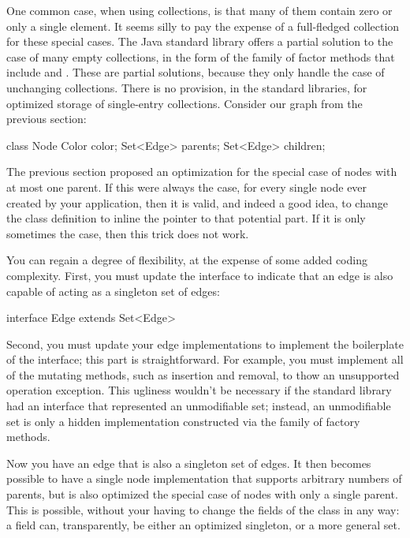 One common case, when using collections, is that many of them contain zero or
only a single element. It seems silly to pay the expense of a full-fledged
collection for these special cases. The Java standard library offers a
partial solution to the case of many empty collections, in the form of the family
of factor methods that include  and
.
These are partial solutions, because they only handle the case of unchanging
collections. There is no provision, in the standard libraries, for optimized
storage of single-entry collections. Consider our graph from the previous
section:
\begin{shortlisting}
class Node {
	Color color;
	Set<Edge> parents;
	Set<Edge> children;
}
\end{shortlisting}
The previous section proposed an optimization for the special case of nodes with
at most one parent. If this were always the case, for every single node ever
created by your application, then it is valid, and indeed a good idea,
to change the  class definition to inline the pointer to that
potential part. If it is only sometimes the case, then this trick does not work.

You can regain a degree of flexibility, at the expense of some added coding
complexity. First, you must update the  interface to indicate that an
edge is also capable of acting as a singleton set of edges:
\begin{shortlisting}
interface Edge extends Set<Edge> {
}
\end{shortlisting}

Second, you must update your edge implementations to implement the boilerplate of
the  interface; this part is straightforward. For example,
you must implement all of the mutating methods, such as insertion and removal,
to thow an unsupported operation exception. This ugliness wouldn't be necessary
if the standard library had an interface that represented an unmodifiable set;
instead, an unmodifiable set is only a hidden implementation constructed via
the  family of factory methods.

Now you have an edge that is also a singleton set of edges. It then becomes
possible to have a single node implementation that supports arbitrary numbers of
parents, but is also optimized the special case of nodes with only a single
parent. This is possible, without your having to change the fields of the
 class in any way: a field  can,
transparently, be either an optimized singleton, or a more general set.

